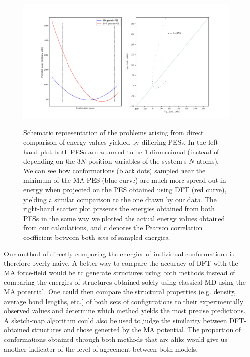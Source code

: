 \documentclass[aps,prb,twocolumn,amsmath,amssymb,superscriptaddress,longbibliography]{revtex4-1}
\newcommand\tab[1][1cm]{\hspace*{#1}} %
\begin{document}
\begin{figure}
\centering
\includegraphics[scale=0.5]{./plots/pseudo-PES}
\label{pes}
\caption{Schematic representation of the problems arising from direct comparison of energy values yielded by differing PESs. In the left-hand plot both PESs are assumed to be 1-dimensional (instead of depending on the $3N$ position variables of the system's $N$ atoms). We can see how conformations (black dots) sampled near the minimum of the MA PES (blue curve) are much more spread out in energy when projected on the PES obtained using DFT (red curve), yielding a similar comparison to the one drawn by our data. The right-hand scatter plot presents the energies obtained from both PESs in the same way we plotted the actual energy values obtained from our calculations, and $r$ denotes the Pearson correlation coefficient between both sets of sampled energies.}
\end{figure}

\tab Our method of directly comparing the energies of individual conformations is therefore overly naive.
A better way to compare the accuracy of DFT with the MA force-field would be to generate structures using both methods instead of comparing the energies of structures obtained solely using classical MD using the MA potential.
One could then compare the structural properties (e.g. density, average bond lengths, etc.) of both sets of configurations to their experimentally observed values and determine which method yields the most precise predictions.
A sketch-map\cite{sketch-map} algorithm could also be used to judge the similarity between DFT-obtained structures and those generted by the MA potential.
The proportion of conformations obtained through both methods that are alike would give us another indicator of the level of agreement between both models. 
\end{document}
